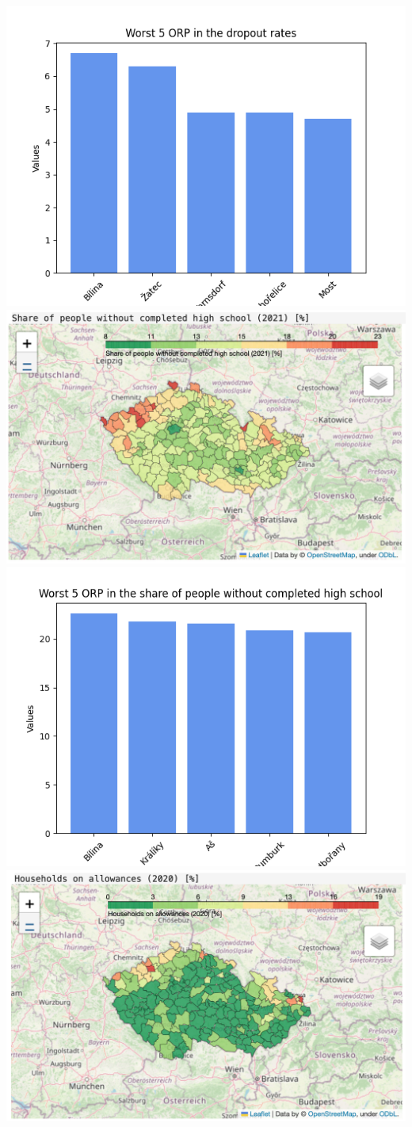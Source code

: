 \documentclass[a4paper, 12pt]{article}
\begin{document}
\begin{center}
    \includegraphics[width=.8\textwidth]{Worst 5 ORP in the dropout rates.png}
    \includegraphics[width=.8\textwidth]{without_high_school.png}
    \includegraphics[width=.8\textwidth]{Worst 5 ORP in the share of people without completed high school.png}
    \includegraphics[width=.8\textwidth]{allowances.png}

\end{center}
\end{document}
